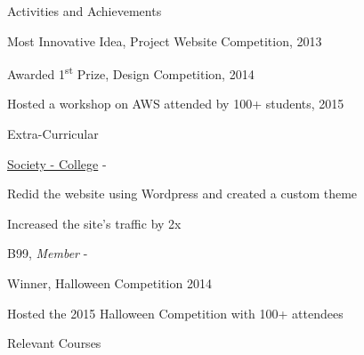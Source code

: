 \documentclass[UKenglish]{resume} %
\begin{document}

\begin{rSection}{Activities and Achievements} \itemsep -2pt
    \item Most Innovative Idea, Project Website Competition, 2013
    \item Awarded 1\textsuperscript{st} Prize, Design Competition, 2014
    \item Hosted a workshop on AWS attended by 100+ students, 2015
\end{rSection}


\begin{rSection}{Extra-Curricular} \itemsep -3pt
    \begin{rSubsection}
        {\href{https://example.com/society/}{Society - College}}
        {  -  }
        {}{}

        \item Redid the website using Wordpress and created a custom theme
        \item Increased the site's traffic by 2x

    \end{rSubsection}


    \begin{rSubsection}
        {B99, {\normalfont \em Member}}
        {  -  }
        {}{}
        \item Winner, Halloween Competition 2014
        \item Hosted the 2015 Halloween Competition with 100+ attendees
    \end{rSubsection}

\end{rSection}


\begin{rSection}{Relevant Courses}
     \tab{}  
    \\  \tab{}  
    \\  \tab{}  
    \\  \tab{}  
\end{rSection}
\end{document}
